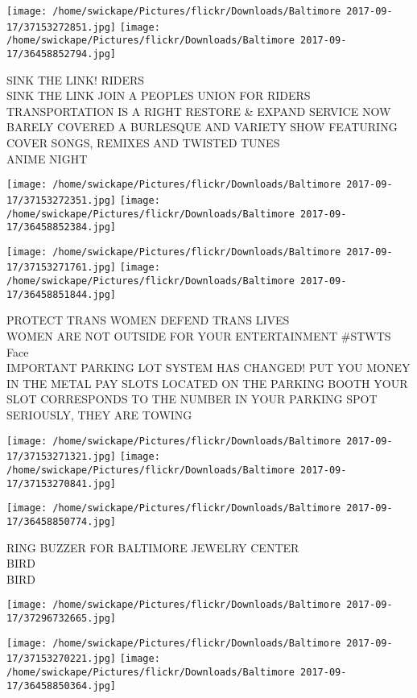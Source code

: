 \documentclass[10pt,letterpaper]{article}
\begin{document}
\texttt{[image: /home/swickape/Pictures/flickr/Downloads/Baltimore 2017-09-17/37153272851.jpg]}
\texttt{[image: /home/swickape/Pictures/flickr/Downloads/Baltimore 2017-09-17/36458852794.jpg]}

SINK THE LINK!  RIDERS\\
SINK THE LINK JOIN A PEOPLES UNION FOR RIDERS TRANSPORTATION IS A RIGHT RESTORE \& EXPAND SERVICE NOW\\
BARELY COVERED A BURLESQUE AND VARIETY SHOW FEATURING COVER SONGS, REMIXES AND TWISTED TUNES\\
ANIME NIGHT
\pagebreak

\texttt{[image: /home/swickape/Pictures/flickr/Downloads/Baltimore 2017-09-17/37153272351.jpg]}
\texttt{[image: /home/swickape/Pictures/flickr/Downloads/Baltimore 2017-09-17/36458852384.jpg]}

\texttt{[image: /home/swickape/Pictures/flickr/Downloads/Baltimore 2017-09-17/37153271761.jpg]}
\texttt{[image: /home/swickape/Pictures/flickr/Downloads/Baltimore 2017-09-17/36458851844.jpg]}

PROTECT TRANS WOMEN DEFEND TRANS LIVES\\
WOMEN ARE NOT OUTSIDE FOR YOUR ENTERTAINMENT \#STWTS\\
Face\\
IMPORTANT PARKING LOT SYSTEM HAS CHANGED!  PUT YOU MONEY IN THE METAL PAY SLOTS LOCATED ON THE PARKING BOOTH YOUR SLOT CORRESPONDS TO THE NUMBER IN YOUR PARKING SPOT SERIOUSLY, THEY ARE TOWING
\pagebreak

\texttt{[image: /home/swickape/Pictures/flickr/Downloads/Baltimore 2017-09-17/37153271321.jpg]}
\texttt{[image: /home/swickape/Pictures/flickr/Downloads/Baltimore 2017-09-17/37153270841.jpg]}

\texttt{[image: /home/swickape/Pictures/flickr/Downloads/Baltimore 2017-09-17/36458850774.jpg]}

RING BUZZER FOR BALTIMORE JEWELRY CENTER\\
BIRD\\
BIRD
\pagebreak

\texttt{[image: /home/swickape/Pictures/flickr/Downloads/Baltimore 2017-09-17/37296732665.jpg]}

\vspace{0.25in}
\texttt{[image: /home/swickape/Pictures/flickr/Downloads/Baltimore 2017-09-17/37153270221.jpg]}
\texttt{[image: /home/swickape/Pictures/flickr/Downloads/Baltimore 2017-09-17/36458850364.jpg]}
\end{document}
